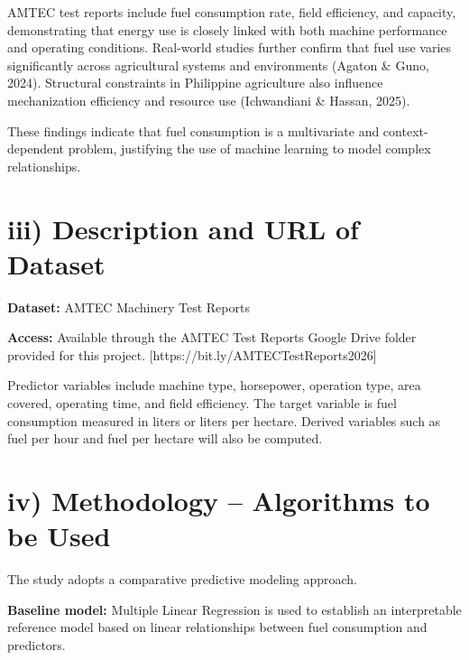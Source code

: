 \documentclass[11pt,twocolumn]{article}
\begin{document}
\vspace{10pt}

AMTEC test reports include fuel consumption rate, field efficiency, and capacity, demonstrating that energy use is closely linked with both machine performance and operating conditions. Real-world studies further confirm that fuel use varies significantly across agricultural systems and environments (Agaton \& Guno, 2024). Structural constraints in Philippine agriculture also influence mechanization efficiency and resource use (Ichwandiani \& Hassan, 2025).

\vspace{10pt}

These findings indicate that fuel consumption is a multivariate and context-dependent problem, justifying the use of machine learning to model complex relationships.

\section*{\small iii) Description and URL of Dataset}

\textbf{Dataset:} AMTEC Machinery Test Reports

\textbf{Access:} Available through the AMTEC Test Reports Google Drive folder provided for this project. [https://bit.ly/AMTECTestReports2026]

\vspace{10pt}

Predictor variables include machine type, horsepower, operation type, area covered, operating time, and field efficiency. The target variable is fuel consumption measured in liters or liters per hectare. Derived variables such as fuel per hour and fuel per hectare will also be computed.

\section*{\small iv) Methodology -- Algorithms to be Used}

The study adopts a comparative predictive modeling approach.

\vspace{10pt}

\textbf{Baseline model:} Multiple Linear Regression is used to establish an interpretable reference model based on linear relationships between fuel consumption and predictors.

\vspace{10pt}
\end{document}
